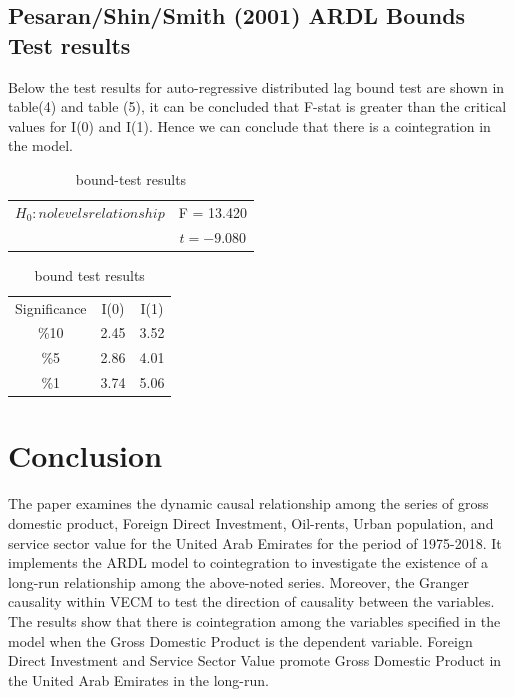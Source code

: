 \documentclass[12pt,a4 paper,title page]{article}
\begin{document}
\hfill\break
\hfill\break
\subsection{Pesaran/Shin/Smith (2001) ARDL Bounds Test results}
Below the test results for auto-regressive distributed lag bound test are shown in table(4) and table (5), it can be concluded that  F-stat is greater than the critical values for I(0) and I(1). Hence we can conclude that there is a cointegration in the model.
\hfill\break
\begin{table}[ht]
    \centering
    \begin{tabular}{c|c}
    $H_0:no levels relationship $    &  F = 13.420 \\
         & $t = -9.080$
    \end{tabular}
    \caption{bound-test results}
    \label{tab:my_label}
\end{table}
\begin{table}[ht]
    \centering
    \begin{tabular}{c|c|c|}
     Significance    &  I(0) & I(1) \\
     \%10   &  2.45   &   3.52 \\
     \%5   &    2.86  &  4.01  \\
     \%1  &    3.74   &   5.06
    \end{tabular}
    \caption{bound test results}
    \label{table5}
\end{table}

\hfill\break
\hfill\break




 
\section{Conclusion}
\begin{flushleft}\justifying
The paper examines the dynamic causal relationship among the series of gross domestic product, Foreign Direct Investment, Oil-rents, Urban population, and service sector value for the United Arab Emirates for the period of 1975-2018.
It implements the ARDL model to cointegration to investigate the existence of a long-run relationship among the above-noted series. \hfill\break
Moreover, the Granger causality within VECM to test the direction of causality between the variables. The results show that there is cointegration among the variables specified in the model when the Gross Domestic Product is the dependent variable. Foreign Direct Investment and Service Sector Value promote Gross Domestic Product in the United Arab Emirates in the long-run.
\end{flushleft}





\clearpage


 
\end{document}
